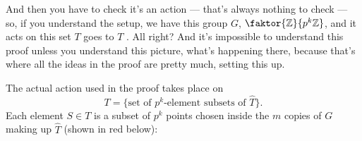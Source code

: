 \begin{proofWrapper}
\begin{speech}[00:49:31 - 00:51:04]
And then you have to check it's an action --- that's always nothing to check --- so, if you understand the setup, we have this group $G$, $\faktor{\mathbb{Z}}{p^k\mathbb{Z}}$, and it acts on this set $T$ goes to $T$ . All right? And it's impossible to understand this proof unless you understand this picture, what's happening there, because that's where all the ideas in the proof are pretty much, setting this up.
\end{speech}

\begin{content}
The actual action used in the proof takes place on
\[
T = \{ \text{set of } p^k\text{-element subsets of } \widehat{T} \}.
\]
Each element $S \in T$ is a subset of $p^k$ points chosen inside the $m$ copies of $G$ making up $\widehat{T}$ (shown in red below):


\end{content}
\end{proofWrapper}
